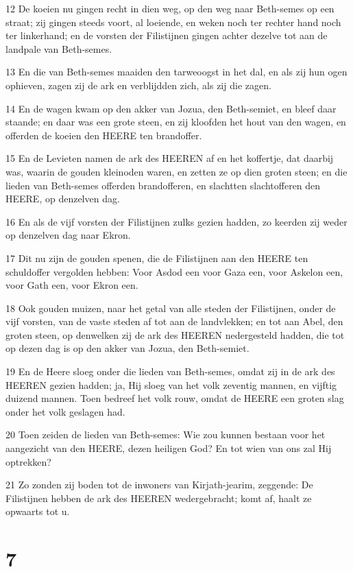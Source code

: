 \par 12 De koeien nu gingen recht in dien weg, op den weg naar Beth-semes op een straat; zij gingen steeds voort, al loeiende, en weken noch ter rechter hand noch ter linkerhand; en de vorsten der Filistijnen gingen achter dezelve tot aan de landpale van Beth-semes.
\par 13 En die van Beth-semes maaiden den tarweoogst in het dal, en als zij hun ogen ophieven, zagen zij de ark en verblijdden zich, als zij die zagen.
\par 14 En de wagen kwam op den akker van Jozua, den Beth-semiet, en bleef daar staande; en daar was een grote steen, en zij kloofden het hout van den wagen, en offerden de koeien den HEERE ten brandoffer.
\par 15 En de Levieten namen de ark des HEEREN af en het koffertje, dat daarbij was, waarin de gouden kleinoden waren, en zetten ze op dien groten steen; en die lieden van Beth-semes offerden brandofferen, en slachtten slachtofferen den HEERE, op denzelven dag.
\par 16 En als de vijf vorsten der Filistijnen zulks gezien hadden, zo keerden zij weder op denzelven dag naar Ekron.
\par 17 Dit nu zijn de gouden spenen, die de Filistijnen aan den HEERE ten schuldoffer vergolden hebben: Voor Asdod een voor Gaza een, voor Askelon een, voor Gath een, voor Ekron een.
\par 18 Ook gouden muizen, naar het getal van alle steden der Filistijnen, onder de vijf vorsten, van de vaste steden af tot aan de landvlekken; en tot aan Abel, den groten steen, op denwelken zij de ark des HEEREN nedergesteld hadden, die tot op dezen dag is op den akker van Jozua, den Beth-semiet.
\par 19 En de Heere sloeg onder die lieden van Beth-semes, omdat zij in de ark des HEEREN gezien hadden; ja, Hij sloeg van het volk zeventig mannen, en vijftig duizend mannen. Toen bedreef het volk rouw, omdat de HEERE een groten slag onder het volk geslagen had.
\par 20 Toen zeiden de lieden van Beth-semes: Wie zou kunnen bestaan voor het aangezicht van den HEERE, dezen heiligen God? En tot wien van ons zal Hij optrekken?
\par 21 Zo zonden zij boden tot de inwoners van Kirjath-jearim, zeggende: De Filistijnen hebben de ark des HEEREN wedergebracht; komt af, haalt ze opwaarts tot u.

\chapter{7}

